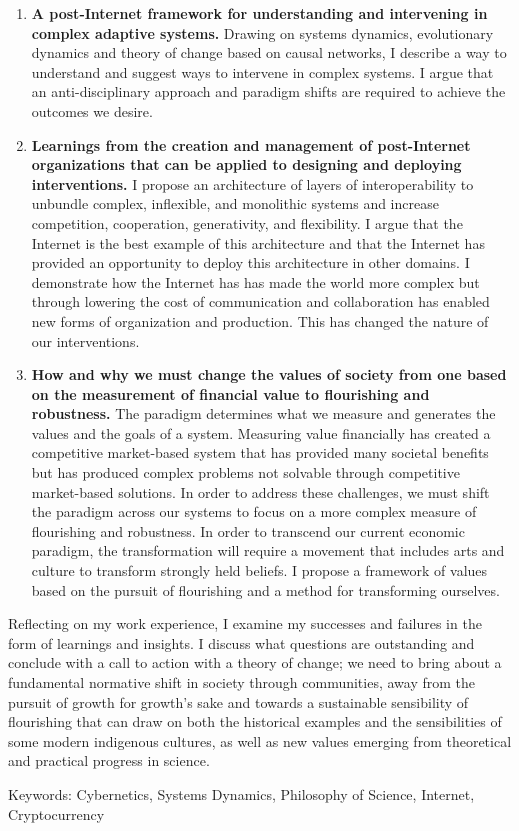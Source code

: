 \begin{enumerate}
\item \textbf{A post-Internet framework for understanding and intervening in complex adaptive systems.} Drawing on systems dynamics, evolutionary dynamics and theory of change based on causal networks, I describe a way to understand and suggest ways to intervene in complex systems. I argue that an anti-disciplinary approach and paradigm shifts are required to achieve the outcomes we desire.
\item \textbf{Learnings from the creation and management of post-Internet organizations that can be applied to designing and deploying interventions.} I propose an architecture of layers of interoperability to unbundle complex, inflexible, and monolithic systems and increase competition, cooperation, generativity, and flexibility. I argue that the Internet is the best example of this architecture and that the Internet has provided an opportunity to deploy this architecture in other domains. I demonstrate how the Internet has has made the world more complex but through lowering the cost of communication and collaboration has enabled new forms of organization and production. This has changed the nature of our interventions.
\item \textbf{How and why we must change the values of society from one based on the measurement of financial value to flourishing and robustness.} The paradigm determines what we measure and generates the values and the goals of a system. Measuring value financially has created a competitive market-based system that has provided many societal benefits but has produced complex problems not solvable through competitive market-based solutions. In order to address these challenges, we must shift the paradigm across our systems to focus on a more complex measure of flourishing and robustness. In order to transcend our current economic paradigm, the transformation will require a movement that includes arts and culture to transform strongly held beliefs. I propose a framework of values based on the pursuit of flourishing and a method for transforming ourselves.
\end{enumerate}

Reflecting on my work experience, I examine my successes and failures in the form of learnings and insights. I discuss what questions are outstanding and conclude with a call to action with a theory of change; we need to bring about a fundamental normative shift in society through communities, away from the pursuit of growth for growth's sake and towards a sustainable sensibility of flourishing that can draw on both the historical examples and the sensibilities of some modern indigenous cultures, as well as new values emerging from theoretical and practical progress in science.

\vfill

Keywords: Cybernetics, Systems Dynamics, Philosophy of Science, Internet, Cryptocurrency

\endgroup